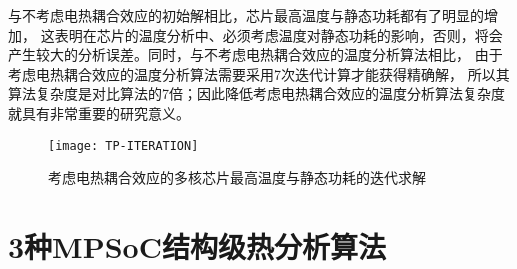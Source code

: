 与不考虑电热耦合效应的初始解相比，芯片最高温度与静态功耗都有了明显的增加， 这表明在芯片的温度分析中、必须考虑温度对静态功耗的影响，否则，将会产生较大的分析误差。同时，与不考虑电热耦合效应的温度分析算法相比， 由于考虑电热耦合效应的温度分析算法需要采用7次迭代计算才能获得精确解， 所以其算法复杂度是对比算法的7倍；因此降低考虑电热耦合效应的温度分析算法复杂度就具有非常重要的研究意义。
\begin{figure}[H]
  \centering
  \texttt{[image: TP-ITERATION]}
  \caption{考虑电热耦合效应的多核芯片最高温度与静态功耗的迭代求解}
  \label{fig:tp-iteration}
\end{figure}


\section{3种MPSoC结构级热分析算法}
\label{sec:SSTAmethod}

